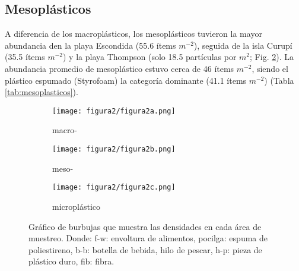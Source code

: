 \subsection{Mesoplásticos}
A diferencia de los macroplásticos, los mesoplásticos tuvieron la mayor abundancia den la playa Escondida (55.6 ítems $m^{-2}$), seguida de la isla Curupí (35.5 ítems $m^{-2}$) y la playa Thompson (solo 18.5 partículas por $m^{2}$; Fig. \ref{fig:meso}). La abundancia promedio de mesoplástico estuvo cerca de 46 ítems $m^{-2}$, siendo el plástico espumado (Styrofoam) la categoría dominante (41.1 ítems $m^{-2}$) (Tabla \ref{tab:mesoplasticos}).

\begin{figure}[h!t]
	\centering
	\begin{subfigure}[b]{0.3\linewidth}
		\texttt{[image: figura2/figura2a.png]}
		\caption{macro-}
		\label{fig:macro}
	\end{subfigure}
	\begin{subfigure}[b]{0.3\linewidth}
		\texttt{[image: figura2/figura2b.png]}
		\caption{meso-}
		\label{fig:meso}
	\end{subfigure}
	\begin{subfigure}[b]{0.3\linewidth}
		\texttt{[image: figura2/figura2c.png]}
		\caption{microplástico}
		\label{fig:micro}
	\end{subfigure}
	\caption{Gráfico de burbujas que muestra las densidades en cada área de muestreo. Donde: f-w: envoltura de alimentos, pocilga: espuma de poliestireno, b-b: botella de bebida, hilo de pescar, h-p: pieza de plástico duro, fib: fibra.}
	\label{fig:densidades}
\end{figure}

